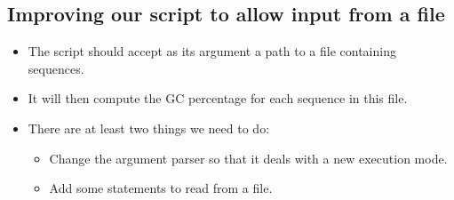 \documentclass[aspectratio=1610,slidestop]{beamer}
\begin{document}
\subsection{Improving our script to allow input from a file}
\begin{pframe}
 \begin{itemize}
  \item The script should accept as its argument a path to a file containing
  sequences.
  \item It will then compute the GC percentage for each sequence in this file.
  \item There are at least two things we need to do:
  \begin{itemize}
   \item Change the argument parser so that it deals with a new execution mode.
   \item Add some statements to read from a file.
  \end{itemize}
 \end{itemize}
\end{pframe}

\end{document}
